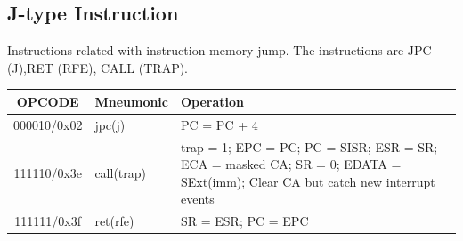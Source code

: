 \documentclass{article}
\begin{document}
  \subsection{J-type Instruction}
Instructions related with instruction memory jump. The instructions are JPC (J),RET (RFE), CALL (TRAP).
  \FloatBarrier
  \begin{table}[H]
    \begin{center}
      \begin{tabular}[pos]{| c | l | m{9cm} |} \hline 	
      \multicolumn{1}{|c|}{\cellcolor[gray]{0.9}\textbf{OPCODE}} & 
      \multicolumn{1}{c|}{\cellcolor[gray]{0.9}\textbf{Mneumonic}} & 
      \multicolumn{1}{m{9cm}|}{\cellcolor[gray]{0.9}\textbf{Operation}} \\ \hline
	 000010/0x02 	& jpc(j) & PC = PC + 4 \\ \hline
	 111110/0x3e 	& call(trap) & 
   trap = 1; \newline EPC = PC; \newline PC = SISR;
   \newline ESR = SR; \newline ECA = masked CA; \newline SR = 0; 
   \newline EDATA = SExt(imm); \newline Clear CA but catch new interrupt events \\ \hline
	 111111/0x3f 	& ret(rfe) & SR = ESR; \newline PC = EPC \\ \hline

      \end{tabular}
    \end{center}
  \end{table} 
\end{document}
